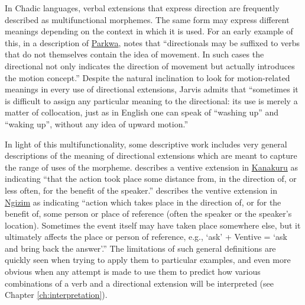 In Chadic languages, verbal extensions that express direction are frequently described as multifunctional morphemes. The same form may express different meanings depending on the context in which it is used. For an early example of this, in a description of \hyperref[park]{Parkwa}, \citet[315--316]{jarvisPodokoVerbalDirectionals1983} notes that ``directionals may be suffixed to verbs that do not themselves contain the idea of movement. In such cases the directional not only indicates the direction of movement but actually introduces the motion concept.'' Despite the natural inclination to look for motion-related meanings in every use of directional extensions, Jarvis admits that ``sometimes it is difficult to assign any particular meaning to the directional: its use is merely a matter of collocation, just as in English one can speak of ``washing up'' and ``waking up'', without any idea of upward motion.'' 

In light of this multifunctionality, some descriptive work includes very general descriptions of the meaning of directional extensions which are meant to capture the range of uses of the morpheme. \citet[73]{newmanKanakuruLanguage1974} describes a ventive extension in \hyperref[kana]{Kanakuru} as indicating ``that the action took place some distance from, in the direction of, or less often, for the benefit of the speaker.'' \citet[26]{schuhAspectsNgizimSyntax1972} describes the ventive extension in \hyperref[ngiz]{Ngizim} as indicating ``action which takes place in the direction of, or for the benefit of, some person or place of reference (often the speaker or the speaker's location). Sometimes the event itself may have taken place somewhere else, but it ultimately affects the place or person of reference, e.g., `ask' + Ventive = `ask and bring back the answer'.'' The limitations of such general definitions are quickly seen when trying to apply them to particular examples, and even more obvious when any attempt is made to use them to predict how various combinations of a verb and a directional extension will be interpreted (see Chapter \ref{ch:interpretation}).


